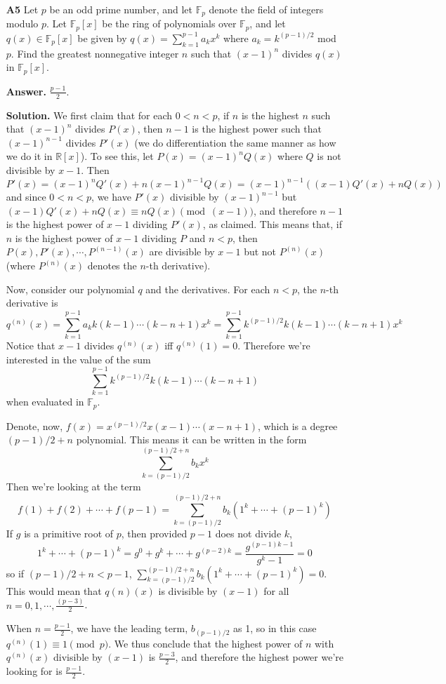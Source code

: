 \documentclass[11pt,a4paper]{article}
\newcommand{\bbR}{\mathbb R}
\newcommand{\bbF}{\mathbb F}
\newcommand{\<}{\langle}
\renewcommand{\>}{\rangle}
\newcommand{\dsum}{\displaystyle\sum}
\begin{document}
\begin{enumerate}
	\item [\textbf{A5}] Let $p$ be an odd prime number, and let $\mathbb{F}_p$ denote the field of integers modulo $p$. Let $\mathbb{F}_p[x]$ be the ring of polynomials over $\mathbb{F}_p$, and let $q(x) \in \mathbb{F}_p[x]$ be given by $q(x) = \sum_{k=1}^{p-1} a_k x^k$ where $a_k = k^{(p-1)/2}$ mod $p$. Find the greatest nonnegative integer $n$ such that $(x-1)^n$ divides $q(x)$ in $\mathbb{F}_p[x]$.
	
	\textbf{Answer.} $\frac{p-1}{2}$. 
	
	\textbf{Solution.} We first claim that for each $0<n<p$, if $n$ is the highest $n$ such that $(x-1)^n$ divides $P(x)$, then $n-1$ is the highest power such that $(x-1)^{n-1}$ divides $P'(x)$ (we do differentiation the same manner as how we do it in $\bbR[x]$). To see this, let $P(x)=(x-1)^nQ(x)$ where $Q$ is not divisible by $x-1$. Then 
	\[
	P'(x)=(x-1)^nQ'(x)+n(x-1)^{n-1}Q(x)=(x-1)^{n-1}((x-1)Q'(x)+nQ(x))
	\]
	and since $0<n<p$, we have $P'(x)$ divisible by $(x-1)^{n-1}$ but $(x-1)Q'(x)+nQ(x)\equiv nQ(x)\pmod{(x-1)}$, and therefore $n-1$ is the highest power of $x-1$ dividing $P'(x)$, as claimed. 
	This means that, if $n$ is the highest power of $x-1$ dividing $P$ and $n<p$, then $P(x), P'(x), \cdots, P^{(n-1)}(x)$ are divisible by $x-1$ but not $P^{(n)}(x)$ (where $P^{(n)}(x)$ denotes the $n$-th derivative). 
	
	Now, consider our polynomial $q$ and the derivatives. For each $n<p$, the $n$-th derivative is 
	\[
	q^{(n)}(x)=\dsum_{k=1}^{p-1}a_kk(k-1)\cdots(k-n+1)x^k
	=\dsum_{k=1}^{p-1}k^{(p-1)/2}k(k-1)\cdots(k-n+1)x^k
	\]
	Notice that $x-1$ divides $q^{(n)}(x)$ iff $q^{(n)}(1)=0$. Therefore we're interested in the value of the sum 
	\[
	\dsum_{k=1}^{p-1}k^{(p-1)/2}k(k-1)\cdots(k-n+1)
	\]
	when evaluated in $\bbF_p$. 
	
	Denote, now, $f(x)=x^{(p-1)/2}x(x-1)\cdots(x-n+1)$, which is a degree $(p-1)/2+n$ polynomial. This means it can be written in the form 
	\[
	\dsum_{k=(p-1)/2}^{(p-1)/2+n} b_kx^k
	\]
	Then we're looking at the term 
	\[
	f(1)+f(2)+\cdots + f(p-1)= \dsum_{k=(p-1)/2}^{(p-1)/2+n} b_k(1^k+\cdots + (p-1)^k)
	\]
	If $g$ is a primitive root of $p$, then provided $p-1$ does not divide $k$, 
	\[
	1^k+\cdots + (p-1)^k
	=g^0+g^k+\cdots + g^{(p-2)k}
	=\frac{g^{(p-1)k-1}}{g^k-1}
	=0
	\]
	so if $(p-1)/2+n<p-1$, $\dsum_{k=(p-1)/2}^{(p-1)/2+n} b_k(1^k+\cdots + (p-1)^k)=0$. 
	This would mean that $q{(n)}(x)$ is divisible by $(x-1)$ for all $n=0, 1, \cdots, \frac{(p-3)}{2}$. 
	
	When $n=\frac{p-1}{2}$, we have the leading term, $b_{(p-1)/2}$ as 1, so in this case $q^{(n)}(1)\equiv 1\pmod{p}$. We thus conclude that the highest power of $n$ with $q^{(n)}(x)$ divisible by $(x-1)$ is $\frac{p-3}{2}$, and therefore the highest power we're looking for is $\frac{p-1}{2}$. 
	

\end{enumerate}
\end{document}
